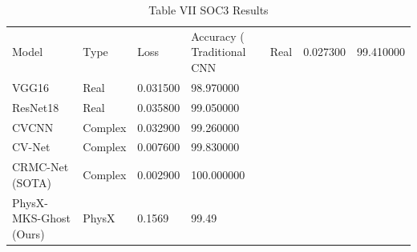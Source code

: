 \begin{table}
\caption{Table VII SOC3 Results}
\begin{tabular}{llll}
\toprule
Model & Type & Loss & Accuracy (%
\midrule
Traditional CNN & Real & 0.027300 & 99.410000 \\
VGG16 & Real & 0.031500 & 98.970000 \\
ResNet18 & Real & 0.035800 & 99.050000 \\
CVCNN & Complex & 0.032900 & 99.260000 \\
CV-Net & Complex & 0.007600 & 99.830000 \\
CRMC-Net (SOTA) & Complex & 0.002900 & 100.000000 \\
PhysX-MKS-Ghost (Ours) & PhysX & 0.1569 & 99.49 \\
\bottomrule
\end{tabular}
\end{table}
